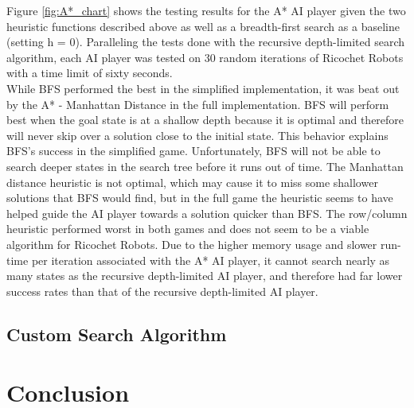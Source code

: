 \documentclass[a4paper,10pt]{article}
\begin{document}
  Figure \ref{fig:A*_chart} shows the testing results for the A* AI player given the two heuristic functions described above as well as a breadth-first search as a
  baseline (setting h = 0).  Paralleling the tests done with the recursive depth-limited search algorithm, each AI player was tested on 30 random iterations of Ricochet
  Robots with a time limit of sixty seconds. \\

  While BFS performed the best in the simplified implementation, it was beat out by the A* - Manhattan Distance in the full implementation.  BFS will perform best when
  the goal state is at a shallow depth because it is optimal and therefore will never skip over a solution close to the initial state.  This behavior explains BFS's
  success in the simplified game.  Unfortunately, BFS will not be able to search deeper states in the search tree before it runs out of time.  The Manhattan distance
  heuristic is not optimal, which may cause it to miss some shallower solutions that BFS would find, but in the full game the heuristic seems to have helped guide the AI
  player towards a solution quicker than BFS.  The row/column heuristic performed worst in both games and does not seem to be a viable algorithm for Ricochet Robots.
  Due to the higher memory usage and slower run-time per iteration associated with the A* AI player, it cannot search nearly as many states as the recursive depth-limited
  AI player, and therefore had far lower success rates than that of the recursive depth-limited AI player. 

  \subsection{Custom Search Algorithm}


\section{Conclusion}
\end{document}
